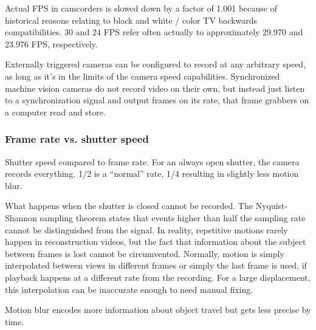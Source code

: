 Actual FPS in camcorders is slowed down by a factor of 1.001 because of historical reasons relating to black and white / color TV backwards compatibilities.
30 and 24 FPS refer often actually to approximately 29.970 and 23.976 FPS, respectively.

Externally triggered cameras can be configured to record at any arbitrary speed, as long as it's in the limits of the camera speed capabilities.
Synchronized machine vision cameras do not record video on their own, but instead just listen to a synchronization signal and output frames on its rate, that frame grabbers on a computer read and store.


\subsubsection{Frame rate vs. shutter speed} %

{Shutter speed compared to frame rate. For an always open shutter, the camera records everything. 1/2 is a ``normal'' rate, 1/4 resulting in slightly less motion blur.}

What happens when the shutter is closed cannot be recorded.
The Nyquist-Shannon sampling theorem states that events higher than half the sampling rate cannot be distinguished from the signal.
In reality, repetitive motions rarely happen in reconstruction videos, but the fact that information about the subject between frames is lost cannot be circumvented.
Normally, motion is simply interpolated between views in different frames or simply the last frame is used, if playback happens at a different rate from the recording.
For a large displacement, this interpolation can be inaccurate enough to need manual fixing.

Motion blur encodes more information about object travel but gets less precise by time.

